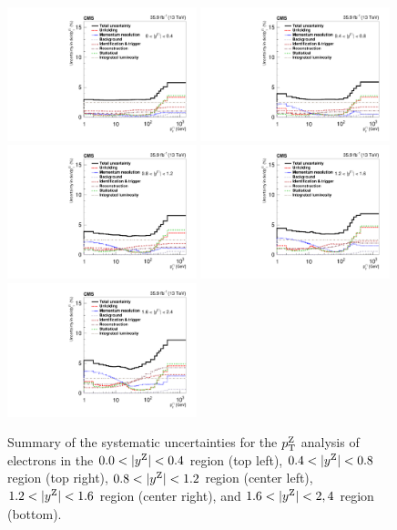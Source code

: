 \begin{figure}
	\centering
	\includegraphics[width=0.49\textwidth]{figures/zpt/histoUnfoldingSystPtRap0_nsel1_dy3.pdf}
	\includegraphics[width=0.49\textwidth]{figures/zpt/histoUnfoldingSystPtRap1_nsel1_dy3.pdf}
	\includegraphics[width=0.49\textwidth]{figures/zpt/histoUnfoldingSystPtRap2_nsel1_dy3.pdf}
	\includegraphics[width=0.49\textwidth]{figures/zpt/histoUnfoldingSystPtRap3_nsel1_dy3.pdf}
	\includegraphics[width=0.49\textwidth]{figures/zpt/histoUnfoldingSystPtRap4_nsel1_dy3.pdf}
	\caption{Summary of the systematic uncertainties for the $p_{\mathrm{T}}^{\mathrm{Z}}$ analysis of electrons in the 
	$0.0 < |y^{\mathrm{Z}}| < 0.4$ region (top left), $0.4 < |y^{\mathrm{Z}}| < 0.8$ region (top right),
	$0.8 < |y^{\mathrm{Z}}| < 1.2$ region (center left), $1.2 < |y^{\mathrm{Z}}| < 1.6$ region (center right), and 
	$1.6 < |y^{\mathrm{Z}}| < 2,4$ region (bottom).
	}
	\label{fig:zpt_syst2}
\end{figure}


